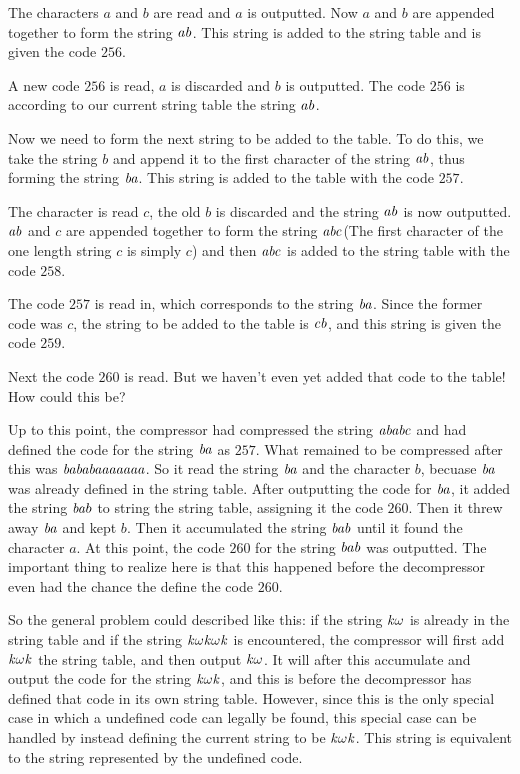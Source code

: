 The characters $a$ and $b$ are read and $a$ is outputted. Now $a$ and
$b$ are appended together to form the string $\mathit{ab}$. This string is
added to the string table and is given the code $256$.

A new code $256$ is read, $a$ is discarded and $b$ is outputted. The
code $256$ is according to our current string table the string
$\mathit{ab}$.

Now we need to form the next string to be added to the table. To do
this, we take the string $b$ and append it to the first character of
the string $\mathit{ab}$, thus forming the string $\mathit{ba}$. This string is added to
the table with the code $257$.

The character is read $c$, the old $b$ is discarded and the string
$\mathit{ab}$ is now outputted. $\mathit{ab}$ and $c$ are appended together
to form the string $\mathit{abc}$(The first character of the one length
string $c$ is simply $c$) and then $\mathit{abc}$ is added to the string
table with the code $258$.

The code $257$ is read in, which corresponds to the string
$\mathit{ba}$. Since the former code was $c$, the string to be added to
the table is $\mathit{cb}$, and this string is given the code $259$.

Next the code $260$ is read. But we haven't even yet added that code
to the table! How could this be?

Up to this point, the compressor had compressed the string
$\mathit{ababc}$ and had defined the code for the string $\mathit{ba}$ as
$257$. What remained to be compressed after this was
$\mathit{bababaaaaaaa}$. So it read the string $\mathit{ba}$ and the
character $b$, becuase $\mathit{ba}$ was already defined in the string
table. After outputting the code for $\mathit{ba}$, it added the string
$\mathit{ba}b$ to string the string table, assigning it the code
$260$. Then it threw away $\mathit{ba}$ and kept $b$. Then it accumulated
the string $\mathit{bab}$ until it found the character $a$. At this
point, the code $260$ for the string $\mathit{bab}$ was outputted.  The
important thing to realize here is that this happened before the
decompressor even had the chance the define the code $260$.

\newcommand{\ko}{\ensuremath{\var{k\omega}}\xspace}
\newcommand{\kok}{\ensuremath{\var{\ko k}}\xspace}
\newcommand{\kokok}{\ensuremath{\var{\kok \omega k}}\xspace}

So the general problem could described like this\cite{welch85:_u}: if
the string \ko is already in the string table and if the string \kokok
is encountered, the compressor will first add \kok the string table,
and then output \ko. It will after this accumulate and output the code
for the string \kok, and this is before the decompressor has defined
that code in its own string table. However, since this is the only
special case in which a undefined code can legally be found, this
special case can be handled by instead defining the current string to
be $\kok$. This string is equivalent to the string represented by the
undefined code.

